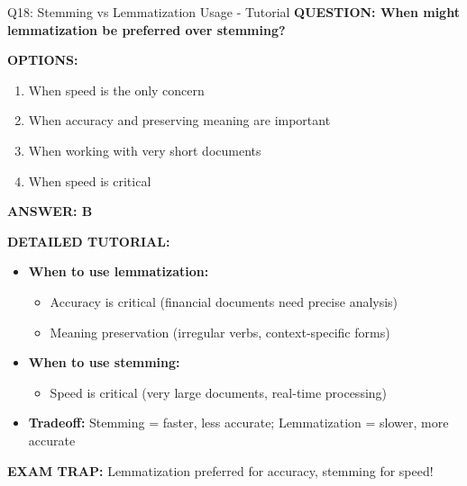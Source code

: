 \documentclass[8pt]{beamer}
\begin{document}
	\begin{frame}{Q18: Stemming vs Lemmatization Usage - Tutorial}
		\fontsize{6.5}{7.5}\selectfont
		\textbf{QUESTION: When might lemmatization be preferred over stemming?}
		
		\vspace{0.1cm}
		\textbf{OPTIONS:}
		\begin{enumerate}
			\item When speed is the only concern
			\item When accuracy and preserving meaning are important
			\item When working with very short documents
			\item When speed is critical
		\end{enumerate}
		
		\vspace{0.1cm}
		\textcolor{myblue}{\textbf{ANSWER: B}}
		
		\vspace{0.1cm}
		\textbf{DETAILED TUTORIAL:}
		\begin{itemize}
			\item \textbf{When to use lemmatization:}
			\begin{itemize}
				\item Accuracy is critical (financial documents need precise analysis)
				\item Meaning preservation (irregular verbs, context-specific forms)
			\end{itemize}
			\item \textbf{When to use stemming:}
			\begin{itemize}
				\item Speed is critical (very large documents, real-time processing)
			\end{itemize}
			\item \textbf{Tradeoff:} Stemming = faster, less accurate; Lemmatization = slower, more accurate
		\end{itemize}
		
		\textcolor{myred}{\textbf{EXAM TRAP:}} Lemmatization preferred for \textcolor{myblue}{accuracy}, stemming for \textcolor{myblue}{speed}!
	\end{frame}
	
\end{document}
